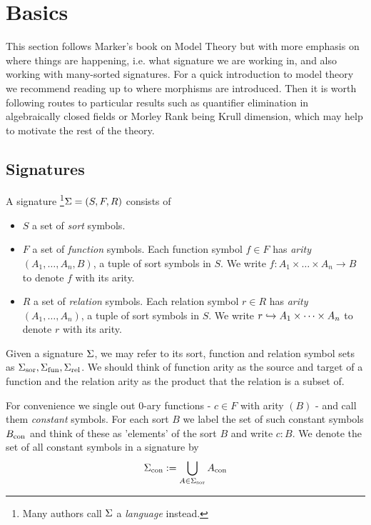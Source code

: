 \section{Basics}
This section follows Marker's book on Model Theory 
\cite{marker} but with more 
emphasis on where things are happening, i.e. what signature we are working in,
and also working with many-sorted signatures.
For a quick introduction to model theory we recommend reading up to where 
morphisms are introduced.
Then it is worth following routes to particular results such as quantifier
elimination in algebraically closed fields or Morley Rank being Krull dimension,
which may help to motivate the rest of the theory.

\subsection{Signatures}
\begin{dfn}[Signature]
    A signature \footnote{
        Many authors call $\Sigma$ a \textit{language} instead.
    }$\Sigma = (S,F,R)$ consists of 
    \begin{itemize}
        \item $S$ a set of \textit{sort} symbols.
        \item $F$ a set of \textit{function} symbols.
            Each function symbol $f \in F$ has \textit{arity} 
            $(A_1,\dots,A_n,B)$, a tuple of sort symbols in $S$.
            We write $f : A_1 \times \dots \times A_n \to B$
            to denote $f$ with its arity.
        \item $R$ a set of \textit{relation} symbols.
            Each relation symbol $r \in R$ has \textit{arity}
            $(A_1,\dots,A_n)$, a tuple of sort symbols in $S$.
            We write $r \hookrightarrow A_1 \times \dots \times A_n$ 
            to denote $r$ with its arity.
    \end{itemize}
    Given a signature $\Sigma$, we may refer to its sort, 
    function and relation symbol sets as ${\Sigma}_\mathrm{sor},{\Sigma}_\mathrm{fun},{\Sigma}_\mathrm{rel}$.
    We should think of function arity as the source and target of a function
    and the relation arity as the product that the relation is a subset of.
    
    For convenience we single out $0$-ary functions  
    - $c \in F$ with arity $(B)$ - and
    call them \textit{constant} symbols.
    For each sort $B$ we label the set of such constant symbols
    ${B}_\mathrm{con}$ and
    think of these as 'elements' of the sort $B$ and write $c : B$.
    We denote the set of all constant symbols in a signature by
    \[{\Sigma}_\mathrm{con} := \bigcup_{A \in {\Sigma}_\mathrm{sor}} {A}_\mathrm{con}\]
\end{dfn}

